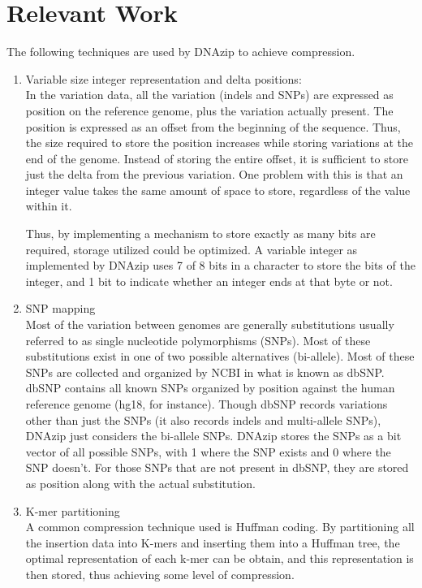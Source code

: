 \documentclass{article}
\begin{document}
\section {Relevant Work}
The following techniques are used by DNAzip to achieve compression.
\begin{enumerate}

\item Variable size integer representation and delta positions:\\
In the variation data, all the variation (indels and SNPs) are expressed as
position on the reference genome, plus the variation actually present. The
position is expressed as an offset from the beginning of the sequence. Thus, the
size required to store the position increases while storing variations at the
end of the genome. Instead of storing the entire offset, it is sufficient to
store just the delta from the previous variation. One problem with this is that
an integer value takes the same amount of space to store, regardless of the
value within it. 

Thus, by implementing a mechanism to store exactly as many bits are required,
storage utilized could be optimized. A variable integer as implemented by DNAzip
uses 7 of 8 bits in a character to store the bits of the integer, and 1 bit to
indicate whether an integer ends at that byte or not.\\

\item{SNP mapping}\\
Most of the variation between genomes are generally substitutions usually
referred to as single nucleotide polymorphisms (SNPs). Most of these
substitutions exist in one of two possible alternatives (bi-allele). Most of
these SNPs are collected and organized by NCBI in what is known as dbSNP. dbSNP
contains all known SNPs organized by position against the human reference genome
(hg18, for instance). Though dbSNP records variations other than just the SNPs
(it also records indels and multi-allele SNPs), DNAzip just considers the
bi-allele SNPs. DNAzip stores the SNPs as a bit vector of all possible SNPs,
with 1 where the SNP exists and 0 where the SNP doesn't. For those SNPs that are
not present in dbSNP, they are stored as position along with the actual
substitution.\\

\item{K-mer partitioning}\\
A common compression technique used is Huffman coding. By partitioning all the
insertion data into K-mers and inserting them into a Huffman tree, the optimal
representation of each k-mer can be obtain, and this representation is then
stored, thus achieving some level of compression.\\
\end{enumerate}
\clearpage
\end{document}
